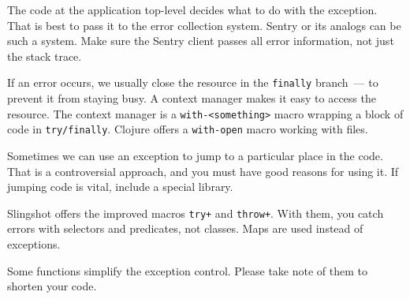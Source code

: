The code at the application top-level decides what to do with the exception.
That is best to pass it to the error collection system. Sentry or its analogs can be such a system. Make sure the Sentry client passes all error information, not just the stack trace.

\mnoindent
If an error occurs, we usually close the resource in the \verb|finally| branch~--- to prevent it from staying busy. A context manager makes it easy to access the resource. The context manager is a \verb|with-<something>| macro wrapping a block of code in \verb|try/finally|. Clojure offers a \verb|with-open| macro working with files.

Sometimes we can use an exception to jump to a particular place in the code. That is a controversial approach, and you must have good reasons for using it. If jumping code is vital, include a special library.

Slingshot offers the improved macros \verb|try+| and \verb|throw+|. With them, you catch errors with selectors and predicates, not classes. Maps are used instead of exceptions.

Some functions simplify the exception control. Please take note of them to shorten your code.
